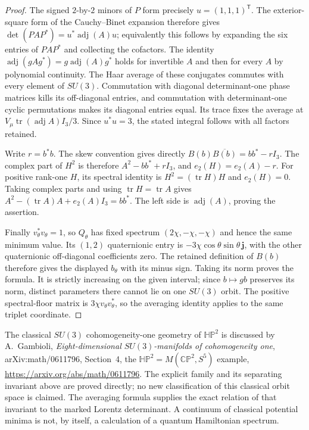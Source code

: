 \begin{proof}
The signed $2$-by-$2$ minors of $P$ form precisely $u=(1,1,1)^{\mathsf T}$.
The exterior-square form of the Cauchy--Binet expansion therefore gives
$\det(PAP^*)=u^*\operatorname{adj}(A)u$; equivalently this follows by
expanding the six entries of $PAP^*$ and collecting the cofactors.
The identity $\operatorname{adj}(gAg^*)=g\operatorname{adj}(A)g^*$
holds for invertible $A$ and then for every $A$ by polynomial continuity.
The Haar average of these conjugates commutes with every element of
$SU(3)$. Commutation with diagonal determinant-one phase matrices kills
its off-diagonal entries, and commutation with determinant-one cyclic
permutations makes its diagonal entries equal. Its trace fixes the
average at $V_\mu\operatorname{tr}(\operatorname{adj}A)I_3/3$.
Since $u^*u=3$, the stated integral follows with all factors retained.

Write $r=b^*b$. The skew convention gives directly
$B(b)\overline{B(b)}=bb^*-rI_3$.
The complex part of $H^2$ is therefore $A^2-bb^*+rI_3$,
and $e_2(H)=e_2(A)-r$.
For positive rank-one $H$, its spectral identity is
$H^2=(\operatorname{tr}H)H$ and $e_2(H)=0$.
Taking complex parts and using $\operatorname{tr}H=\operatorname{tr}A$
gives
$A^2-(\operatorname{tr}A)A+e_2(A)I_3=bb^*$.
The left side is $\operatorname{adj}(A)$, proving the assertion.

Finally $v_\theta^*v_\theta=1$, so $Q_\theta$ has fixed spectrum
$(2\chi,-\chi,-\chi)$ and hence the same minimum value.
Its $(1,2)$ quaternionic entry is
$-3\chi\cos\theta\sin\theta\,\mathbf j$, with the other quaternionic
off-diagonal coefficients zero. The retained definition of $B(b)$
therefore gives the displayed $b_\theta$ with its minus sign.
Taking its norm proves the formula. It is strictly increasing on the
given interval; since $b\mapsto gb$ preserves its norm, distinct
parameters there cannot lie on one $SU(3)$ orbit.
The positive spectral-floor matrix is $3\chi v_\theta v_\theta^*$,
so the averaging identity applies to the same triplet coordinate.
\end{proof}

The classical $SU(3)$ cohomogeneity-one geometry of $\mathbb{HP}^2$
is discussed by A.~Gambioli, \emph{Eight-dimensional $SU(3)$-manifolds
of cohomogeneity one}, arXiv:math/0611796, Section~4, the
$\mathbb{HP}^2=M(\mathbb{CP}^2,S^5)$ example,
\url{https://arxiv.org/abs/math/0611796}.
The explicit family and its separating invariant above are proved
directly; no new classification of this classical orbit space is claimed.
The averaging formula supplies the exact relation of that invariant to
the marked Lorentz determinant. A continuum of classical potential
minima is not, by itself, a calculation of a quantum Hamiltonian spectrum.

